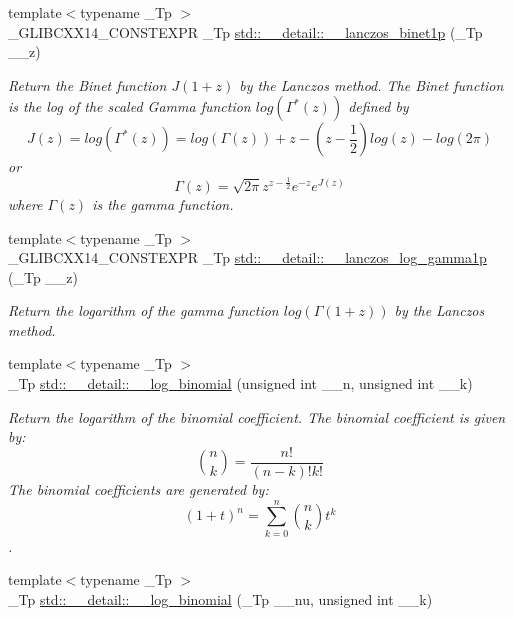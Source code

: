 \begin{DoxyCompactItemize}
{\footnotesize template$<$typename \+\_\+\+Tp $>$ }\\\+\_\+\+G\+L\+I\+B\+C\+X\+X14\+\_\+\+C\+O\+N\+S\+T\+E\+X\+PR \+\_\+\+Tp \hyperlink{namespacestd_1_1____detail_a84722b82d6d614aa4653eb7559f7d508}{std\+::\+\_\+\+\_\+detail\+::\+\_\+\+\_\+lanczos\+\_\+binet1p} (\+\_\+\+Tp \+\_\+\+\_\+z)
\begin{DoxyCompactList}\small\item\em Return the Binet function $ J(1+z) $ by the Lanczos method. The Binet function is the log of the scaled Gamma function $ log(\Gamma^*(z)) $ defined by \[ J(z) = log(\Gamma^*(z)) = log\left(\Gamma(z)\right) + z - \left(z-\frac{1}{2}\right) log(z) - log(2\pi) \] or \[ \Gamma(z) = \sqrt{2\pi}z^{z-\frac{1}{2}}e^{-z}e^{J(z)} \] where $ \Gamma(z) $ is the gamma function. \end{DoxyCompactList}\item 
{\footnotesize template$<$typename \+\_\+\+Tp $>$ }\\\+\_\+\+G\+L\+I\+B\+C\+X\+X14\+\_\+\+C\+O\+N\+S\+T\+E\+X\+PR \+\_\+\+Tp \hyperlink{namespacestd_1_1____detail_a4586aeea80ba556ab8d6393dadb05c5c}{std\+::\+\_\+\+\_\+detail\+::\+\_\+\+\_\+lanczos\+\_\+log\+\_\+gamma1p} (\+\_\+\+Tp \+\_\+\+\_\+z)
\begin{DoxyCompactList}\small\item\em Return the logarithm of the gamma function $ log(\Gamma(1+z)) $ by the Lanczos method. \end{DoxyCompactList}\item 
{\footnotesize template$<$typename \+\_\+\+Tp $>$ }\\\+\_\+\+Tp \hyperlink{namespacestd_1_1____detail_a087d65f98ba6a6709b4d62fa32445e59}{std\+::\+\_\+\+\_\+detail\+::\+\_\+\+\_\+log\+\_\+binomial} (unsigned int \+\_\+\+\_\+n, unsigned int \+\_\+\+\_\+k)
\begin{DoxyCompactList}\small\item\em Return the logarithm of the binomial coefficient. The binomial coefficient is given by\+: \[ \binom{n}{k} = \frac{n!}{(n-k)! k!} \] The binomial coefficients are generated by\+: \[ \left(1 + t\right)^n = \sum_{k=0}^n \binom{n}{k} t^k \]. \end{DoxyCompactList}\item 
{\footnotesize template$<$typename \+\_\+\+Tp $>$ }\\\+\_\+\+Tp \hyperlink{namespacestd_1_1____detail_af8613458310f575d1a1b162553abe4aa}{std\+::\+\_\+\+\_\+detail\+::\+\_\+\+\_\+log\+\_\+binomial} (\+\_\+\+Tp \+\_\+\+\_\+nu, unsigned int \+\_\+\+\_\+k)

\end{DoxyCompactItemize}
